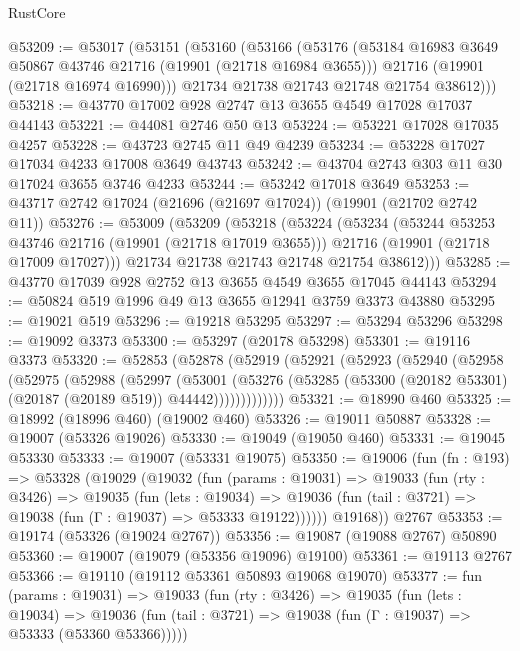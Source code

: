 \begin{lexlean}{RustCore}
\begin{coremodule}
@53209 := @53017
    (@53151
      (@53160
        (@53166
          (@53176
            (@53184 @16983 @3649 @50867 @43746 @21716 (@19901 (@21718 @16984 @3655)))
            @21716
            (@19901 (@21718 @16974 @16990)))
          @21734
          @21738
          @21743
          @21748
          @21754
          @38612)))
@53218 := @43770 @17002 @928 @2747 @13 @3655 @4549 @17028 @17037 @44143
@53221 := @44081 @2746 @50 @13
@53224 := @53221 @17028 @17035 @4257
@53228 := @43723 @2745 @11 @49 @4239
@53234 := @53228 @17027 @17034 @4233 @17008 @3649 @43743
@53242 := @43704 @2743 @303 @11 @30 @17024 @3655 @3746 @4233
@53244 := @53242 @17018 @3649
@53253 := @43717 @2742 @17024 (@21696 (@21697 @17024)) (@19901 (@21702 @2742 @11))
@53276 := @53009
    (@53209
      (@53218
        (@53224
          (@53234
            (@53244 @53253 @43746 @21716 (@19901 (@21718 @17019 @3655)))
            @21716
            (@19901 (@21718 @17009 @17027)))
          @21734
          @21738
          @21743
          @21748
          @21754
          @38612)))
@53285 := @43770 @17039 @928 @2752 @13 @3655 @4549 @3655 @17045 @44143
@53294 := @50824 @519 @1996 @49 @13 @3655 @12941 @3759 @3373 @43880
@53295 := @19021 @519
@53296 := @19218 @53295
@53297 := @53294 @53296
@53298 := @19092 @3373
@53300 := @53297 (@20178 @53298)
@53301 := @19116 @3373
@53320 := @52853
    (@52878
      (@52919
        (@52921
          (@52923
            (@52940
              (@52958
                (@52975
                  (@52988
                    (@52997
                      (@53001
                        (@53276
                          (@53285 (@53300 (@20182 @53301) (@20187 (@20189 @519)) @44442)))))))))))))
@53321 := @18990 @460
@53325 := @18992 (@18996 @460) (@19002 @460)
@53326 := @19011 @50887
@53328 := @19007 (@53326 @19026)
@53330 := @19049 (@19050 @460)
@53331 := @19045 @53330
@53333 := @19007 (@53331 @19075)
@53350 := @19006
    (fun (fn : @193) =>
    @53328
      (@19029
        (@19032
          (fun (params : @19031) =>
          @19033
            (fun (rty : @3426) =>
            @19035
              (fun (lets : @19034) =>
              @19036 (fun (tail : @3721) => @19038 (fun (Γ : @19037) => @53333 @19122))))))
        @19168))
    @2767
@53353 := @19174 (@53326 (@19024 @2767))
@53356 := @19087 (@19088 @2767) @50890
@53360 := @19007 (@19079 (@53356 @19096) @19100)
@53361 := @19113 @2767
@53366 := @19110 (@19112 @53361 @50893 @19068 @19070)
@53377 := fun (params : @19031) =>
  @19033
    (fun (rty : @3426) =>
    @19035
      (fun (lets : @19034) =>
      @19036 (fun (tail : @3721) => @19038 (fun (Γ : @19037) => @53333 (@53360 @53366)))))

\end{coremodule}
\end{lexlean}
